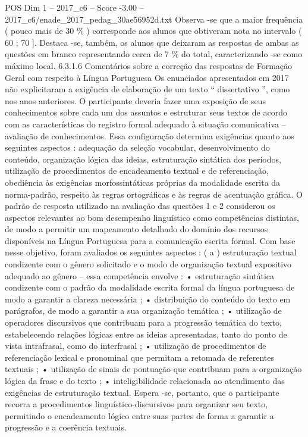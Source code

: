 \begin{textsample}{POS Dim 1 – 2017\_c6 – Score -3.00 – 2017\_c6/enade\_2017\_pedag\_30ae56952d.txt}
Observa -se que a maior frequência ( pouco mais de 30 \% ) corresponde aos alunos que obtiveram nota no intervalo ( 60 ; 70 ].
Destaca -se, também, os alunos que deixaram as respostas de ambas as questões em branco representando cerca de 7 \% do total, caracterizando -se como máximo local. 6.3.1.6 Comentários sobre a correção das respostas de Formação Geral com respeito à Língua Portuguesa Os enunciados apresentados em 2017 não explicitaram a exigência de elaboração de um texto “ dissertativo ”, como nos anos anteriores.
O participante deveria fazer uma exposição de seus conhecimentos sobre cada um dos assuntos e estruturar seus textos de acordo com as características do registro formal adequado à situação comunicativa – avaliação de conhecimentos.
Essa configuração determina exigências quanto aos seguintes aspectos : adequação da seleção vocabular, desenvolvimento do conteúdo, organização lógica das ideias, estruturação sintática dos períodos, utilização de procedimentos de encadeamento textual e de referenciação, obediência às exigências morfossintáticas próprias da modalidade escrita da norma-padrão, respeito às regras ortográficas e às regras de acentuação gráfica.
O padrão de resposta utilizado na avaliação das questões 1 e 2 considerou os aspectos relevantes ao bom desempenho linguístico como competências distintas, de modo a permitir um mapeamento detalhado do domínio dos recursos disponíveis na Língua Portuguesa para a comunicação escrita formal.
Com base nesse objetivo, foram avaliados os seguintes aspectos : ( a ) estruturação textual condizente com o gênero solicitado e o modo de organização textual expositivo adequado ao gênero – essa competência envolve : • estruturação sintática condizente com o padrão da modalidade escrita formal da língua portuguesa de modo a garantir a clareza necessária ; • distribuição do conteúdo do texto em parágrafos, de modo a garantir a sua organização temática ; • utilização de operadores discursivos que contribuam para a progressão temática do texto, estabelecendo relações lógicas entre as ideias apresentadas, tanto do ponto de vista intrafrasal, como do interfrasal ; • utilização de procedimentos de referenciação lexical e pronominal que permitam a retomada de referentes textuais ; • utilização de sinais de pontuação que contribuam para a organização lógica da frase e do texto ; • inteligibilidade relacionada ao atendimento das exigências de estruturação textual.
Espera -se, portanto, que o participante recorra a procedimentos linguístico-discursivos para organizar seu texto, permitindo o encadeamento lógico entre suas partes de forma a garantir a progressão e a coerência textuais.

\end{textsample}
